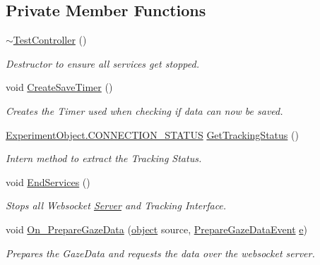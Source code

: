 \subsection*{Private Member Functions}
\begin{DoxyCompactItemize}
\item 
\hyperlink{class_web_analyzer_1_1_controller_1_1_test_controller_a9404350d73eb0d40751b1bdee5171b71}{$\sim$\+Test\+Controller} ()
\begin{DoxyCompactList}\small\item\em Destructor to ensure all services get stopped. \end{DoxyCompactList}\item 
void \hyperlink{class_web_analyzer_1_1_controller_1_1_test_controller_a448797a07babe883ab8d8e646272a6eb}{Create\+Save\+Timer} ()
\begin{DoxyCompactList}\small\item\em Creates the Timer used when checking if data can now be saved. \end{DoxyCompactList}\item 
\hyperlink{class_web_analyzer_1_1_u_i_1_1_interaction_objects_1_1_experiment_object_a2875208b4f4b0ed643593152f4ec025c}{Experiment\+Object.\+C\+O\+N\+N\+E\+C\+T\+I\+O\+N\+\_\+\+S\+T\+A\+T\+U\+S} \hyperlink{class_web_analyzer_1_1_controller_1_1_test_controller_aef58517bbc760e87c541cc4b0272957c}{Get\+Tracking\+Status} ()
\begin{DoxyCompactList}\small\item\em Intern method to extract the Tracking Status. \end{DoxyCompactList}\item 
void \hyperlink{class_web_analyzer_1_1_controller_1_1_test_controller_af7260e39f8963732f38631dd618da497}{End\+Services} ()
\begin{DoxyCompactList}\small\item\em Stops all Websocket \hyperlink{namespace_web_analyzer_1_1_server}{Server} and Tracking Interface. \end{DoxyCompactList}\item 
void \hyperlink{class_web_analyzer_1_1_controller_1_1_test_controller_a61584d87704fffabf4ff0f8c04b33407}{On\+\_\+\+Prepare\+Gaze\+Data} (\hyperlink{_u_i_2_h_t_m_l_resources_2js_2lib_2underscore_8min_8js_aae18b7515bb2bc4137586506e7c0c903}{object} source, \hyperlink{class_web_analyzer_1_1_events_1_1_prepare_gaze_data_event}{Prepare\+Gaze\+Data\+Event} \hyperlink{_u_i_2_h_t_m_l_resources_2js_2lib_2bootstrap_8min_8js_ab5902775854a8b8440bcd25e0fe1c120}{e})
\begin{DoxyCompactList}\small\item\em Prepares the Gaze\+Data and requests the data over the websocket server. \end{DoxyCompactList}\end{DoxyCompactItemize}
